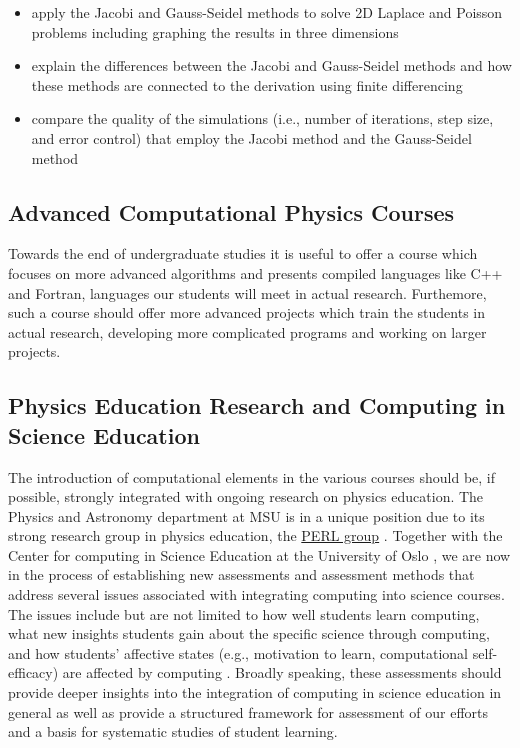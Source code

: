 \documentclass[graybox,envcountchap,sectrefs]{svmult}
\begin{document}
\begin{itemize}
\item apply the Jacobi and Gauss-Seidel methods to solve 2D Laplace and Poisson problems including graphing the results in three dimensions

\item explain the differences between the Jacobi and Gauss-Seidel methods and how these methods are connected to the derivation using finite differencing

\item compare the quality of the simulations (i.e., number of iterations, step size, and error control) that employ the Jacobi method and the Gauss-Seidel method
\end{itemize}


\subsection{Advanced Computational Physics Courses}
Towards the end of undergraduate studies it is useful to offer a course which focuses on more advanced algorithms and presents compiled languages like C++ and Fortran, languages our students will meet in actual research.
Furthemore, such a course should offer more advanced projects which train the students in actual research, developing more complicated programs and working on larger projects.

\subsection{Physics Education Research and Computing in Science Education}
The introduction of computational elements in the various courses should be, if possible,  strongly integrated with ongoing research on physics education.
The Physics and Astronomy department at MSU is in a unique position due to its strong research group in physics education, the \href{{http://www.pa.msu.edu/research/physics-education-lab}}{PERL group} \cite{PERLMSU}. Together with the Center for computing in Science Education at the University of Oslo \cite{CCSEUiO}, we are now in the process
of establishing new assessments
and assessment methods that address several issues associated with
integrating computing into science courses. The issues include but
are not limited to how well students learn computing, what new
insights students gain about the specific science through computing,
and how students' affective states (e.g., motivation to learn,
computational self-efficacy) are affected by computing . Broadly
speaking, these assessments should provide deeper insights into the
integration of computing  in science education in general as well as
provide a structured framework for assessment of our efforts and a
basis for systematic studies of student learning.
\end{document}
